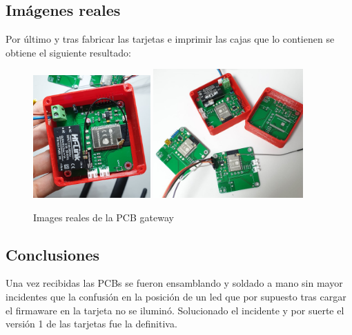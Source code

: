 \documentclass[a4paper ,12pt, onecolumn]{article}
\begin{document}
    \subsection{Imágenes reales}
        Por último y tras fabricar las tarjetas e imprimir las cajas que lo contienen se obtiene el siguiente resultado:
        \begin{center}
            \begin{figure}[h]
                \centering
                \includegraphics[width=0.4\textwidth]{../3d_antenna.jpeg}
                \includegraphics[width=0.51\textwidth]{../real_master_pcb.jpeg}
                \caption{Images reales de la PCB gateway}
                \label{fig:mesh1}
            \end{figure}    
        \end{center}
    \subsection{Conclusiones}
        Una vez recibidas las PCBs se fueron ensamblando y soldado a mano sin mayor incidentes que la confusión en la 
        posición de un led que por supuesto tras cargar el firmaware en la tarjeta no se iluminó.
        Solucionado el incidente y por suerte el versión 1 de las tarjetas fue la definitiva.
\end{document}
